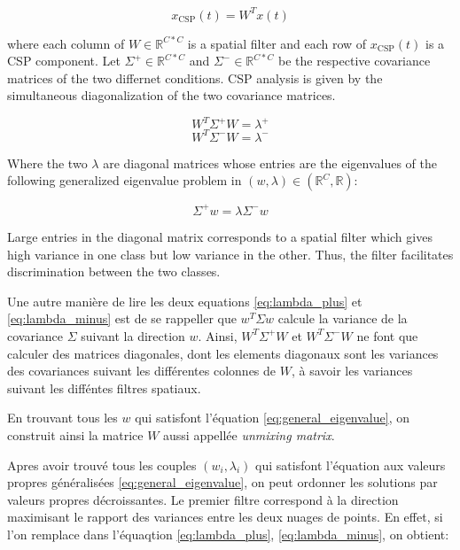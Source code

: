 \begin{equation}
    x_{\text{CSP}}(t) = W^{T}x(t)
\end{equation}

where each column of $W \in \mathbb{R}^{C*C}$ is a spatial filter and each row of $x_{\text{CSP}}(t)$ is a CSP component. Let $\Sigma^{+} \in \mathbb{R}^{C * C}$ and $\Sigma^{-} \in \mathbb{R}^{C * C}$ be the respective covariance matrices of the two differnet  conditions. CSP analysis is given by the simultaneous diagonalization of the two covariance matrices.


\begin{equation}
     W^{T} \Sigma^{+} W = \lambda^{+}
     \label{eq:lambda_plus}
\end{equation}
\begin{equation}
    W^{T} \Sigma^{-} W = \lambda^{-}
    \label{eq:lambda_minus}
\end{equation}

Where the two $\lambda$ are diagonal matrices whose entries are the eigenvalues of the following generalized eigenvalue problem in $(w, \lambda) \in (\mathbb{R}^{C}, \mathbb{R})$:

\begin{equation}
    \Sigma^{+} w = \lambda \Sigma^{-} w
    \label{eq:general_eigenvalue}
\end{equation}

Large entries in the diagonal matrix corresponds to a spatial filter which gives high variance in one class but low variance in the other. Thus, the filter facilitates discrimination between the two classes.


Une autre manière de lire les deux equations \ref{eq:lambda_plus} et \ref{eq:lambda_minus} est de se rappeller que $w^{T}\Sigma w$ calcule la variance de la covariance $\Sigma$ suivant la direction $w$. Ainsi, $W^{T} \Sigma^{+} W$ et $W^{T} \Sigma^{-} W$ ne font que calculer des matrices diagonales, dont les elements diagonaux sont les variances des covariances suivant les différentes colonnes de $W$, à savoir les variances suivant les difféntes filtres spatiaux.

En trouvant tous les $w$ qui satisfont l'équation \ref{eq:general_eigenvalue}, on construit ainsi la matrice $W$ aussi appellée \textit{unmixing matrix}.

Apres avoir trouvé tous les couples $(w_i, \lambda_i)$ qui satisfont l'équation aux valeurs propres généralisées \ref{eq:general_eigenvalue}, on peut ordonner les solutions par valeurs propres décroissantes. Le premier filtre correspond à la direction maximisant le rapport des variances entre les deux nuages de points. En effet, si l'on remplace dans l'équaqtion \ref{eq:lambda_plus}, \ref{eq:lambda_minus}, on obtient:

